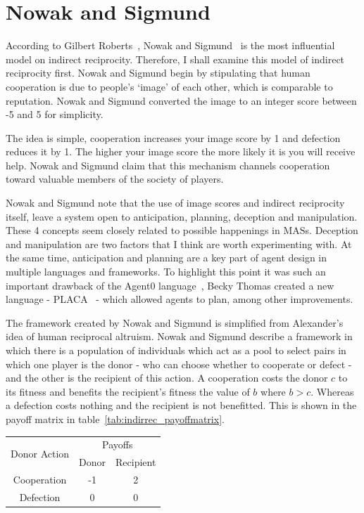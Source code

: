 \documentclass[]{final_report}
\begin{document}
\section{Nowak and Sigmund}
\label{sec:nowak_sig}
According to Gilbert Roberts~\cite{evoldirindir}, Nowak and Sigmund~\cite{evol_indirect_image} is the most influential model on indirect reciprocity. Therefore, I shall examine this model of indirect reciprocity first. Nowak and Sigmund begin by stipulating that human cooperation is due to people's `image' of each other, which is comparable to reputation. Nowak and Sigmund converted the image to an integer score between -5 and 5 for simplicity.\par
The idea is simple, cooperation increases your image score by 1 and defection reduces it by 1. The higher your image score the more likely it is you will receive help. Nowak and Sigmund claim that this mechanism channels cooperation toward valuable members of the society of players.\par
Nowak and Sigmund note that the use of image scores and indirect reciprocity itself, leave a system open to anticipation, planning, deception and manipulation. These 4 concepts seem closely related to possible happenings in MASs. Deception and manipulation are two factors that I think are worth experimenting with. At the same time, anticipation and planning are a key part of agent design in multiple languages and frameworks. To highlight this point it was such an important drawback of the Agent0 language~\cite{shoham1991agent0}, Becky Thomas created a new language - PLACA~\cite{thomas1993placa} - which allowed agents to plan, among other improvements.\par
The framework created by Nowak and Sigmund is simplified from Alexander's~\cite{alexander1987biology} idea of human reciprocal altruism. Nowak and Sigmund describe a framework in which there is a population of individuals which act as a pool to select pairs in which one player is the donor - who can choose whether to cooperate or defect - and the other is the recipient of this action. A cooperation costs the donor $c$ to its fitness and benefits the recipient's fitness the value of $b$ where $b>c$. Whereas a defection costs nothing and the recipient is not benefitted. This is shown in the payoff matrix in table~\ref{tab:indirrec_payoffmatrix}.\par
\begin{framed}
	\begin{center}
		\begin{tabular}{c|c|c}
		\multirow{2}{*}{Donor Action} & \multicolumn{2}{c}{Payoffs}\\	
		& Donor & Recipient\\
		\hline
		Cooperation & -1 & 2\\
		\hline
		Defection & 0 & 0\\
		\end{tabular}
		\label{tab:indirrec_payoffmatrix}
	\end{center}	
\end{framed}
\end{document}
